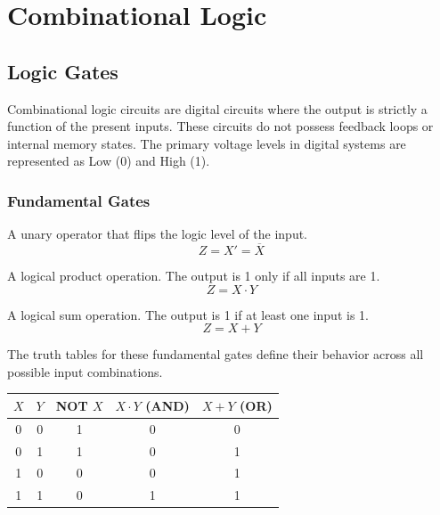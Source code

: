 \chapter{Combinational Logic}

\section{Logic Gates}

\begin{definition}
Combinational logic circuits are digital circuits where the output is strictly a function of the present inputs. These circuits do not possess feedback loops or internal memory states. The primary voltage levels in digital systems are represented as Low (0) and High (1).
\end{definition}

\subsection{Fundamental Gates}

\begin{vocabulary}
A unary operator that flips the logic level of the input.
\begin{equation}
Z = X' = \overline{X}
\end{equation}
\end{vocabulary}

\begin{vocabulary}[AND]
A logical product operation. The output is 1 only if all inputs are 1.
\begin{equation}
Z = X \cdot Y
\end{equation}
\end{vocabulary}

\begin{vocabulary}[OR]
A logical sum operation. The output is 1 if at least one input is 1.
\begin{equation}
Z = X + Y
\end{equation}
\end{vocabulary}

\begin{remark}
The truth tables for these fundamental gates define their behavior across all possible input combinations.
\end{remark}

\vspace{10pt}
\begin{center}
\begin{tabular}{|c|c||c|c|c|}
\hline
$X$ & $Y$ & NOT $X$ & $X \cdot Y$ (AND) & $X + Y$ (OR) \\
\hline
0 & 0 & 1 & 0 & 0 \\
0 & 1 & 1 & 0 & 1 \\
1 & 0 & 0 & 0 & 1 \\
1 & 1 & 0 & 1 & 1 \\
\hline
\end{tabular}
\end{center}

